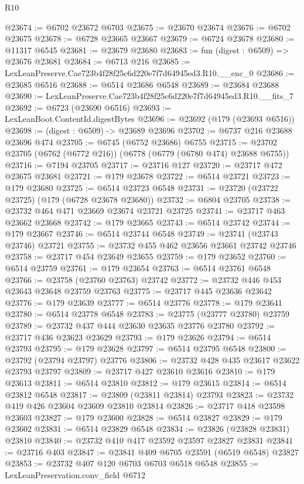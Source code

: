 \begin{lexlean}{R10}
\begin{coremodule}
@23674 := @6702 @23672 @6703
@23675 := @23670 @23674
@23676 := @6702 @23675
@23678 := @6728 @23665 @23667
@23679 := @6724 @23678
@23680 := @11317 @6545
@23681 := @23679 @23680
@23683 := fun (digest : @6509) => @23676 @23681
@23684 := @6713 @216
@23685 := LexLeanPreserve.Cae723b4f28f25c6d220e7f7d64945ed3.R10.__enc_0
@23686 := @23685 @6516
@23688 := @6514 @23686 @6548
@23689 := @23684 @23688
@23690 := LexLeanPreserve.Cae723b4f28f25c6d220e7f7d64945ed3.R10.__fits_7
@23692 := @6723 (@23690 @6516)
@23693 := LexLeanBoot.ContentId.digestBytes
@23696 := @23692 (@179 (@23693 @6516))
@23698 := (digest : @6509) -> @23689 @23696
@23702 := @6737 @216 @23688 @23696 @474
@23705 := @6745 (@6752 @23686) @6755
@23715 := @23702 @23705 (@6762 (@6772 @216)) (@6778 (@6779 (@6780 @474) @23688 @6755))
@23716 := @7194 @23705
@23717 := @23716 @127
@23720 := @23717 @472 @23675 @23681
@23721 := @179 @23678
@23722 := @6514 @23721
@23723 := @179 @23680
@23725 := @6514 @23723 @6548
@23731 := @23720 (@23722 @23725) (@179 (@6728 @23678 @23680))
@23732 := @6804 @23705
@23738 := @23732 @464 @471 @23669 @23674 @23721 @23725
@23741 := @23717 @463 @23662 @23668
@23742 := @179 @23665
@23743 := @6514 @23742
@23744 := @179 @23667
@23746 := @6514 @23744 @6548
@23749 := @23741 (@23743 @23746) @23721
@23755 := @23732 @455 @462 @23656 @23661 @23742 @23746
@23758 := @23717 @454 @23649 @23655
@23759 := @179 @23652
@23760 := @6514 @23759
@23761 := @179 @23654
@23763 := @6514 @23761 @6548
@23766 := @23758 (@23760 @23763) @23742
@23772 := @23732 @446 @453 @23643 @23648 @23759 @23763
@23775 := @23717 @445 @23636 @23642
@23776 := @179 @23639
@23777 := @6514 @23776
@23778 := @179 @23641
@23780 := @6514 @23778 @6548
@23783 := @23775 (@23777 @23780) @23759
@23789 := @23732 @437 @444 @23630 @23635 @23776 @23780
@23792 := @23717 @436 @23623 @23629
@23793 := @179 @23626
@23794 := @6514 @23793
@23795 := @179 @23628
@23797 := @6514 @23795 @6548
@23800 := @23792 (@23794 @23797) @23776
@23806 := @23732 @428 @435 @23617 @23622 @23793 @23797
@23809 := @23717 @427 @23610 @23616
@23810 := @179 @23613
@23811 := @6514 @23810
@23812 := @179 @23615
@23814 := @6514 @23812 @6548
@23817 := @23809 (@23811 @23814) @23793
@23823 := @23732 @419 @426 @23604 @23609 @23810 @23814
@23826 := @23717 @418 @23598 @23603
@23827 := @179 @23600
@23828 := @6514 @23827
@23829 := @179 @23602
@23831 := @6514 @23829 @6548
@23834 := @23826 (@23828 @23831) @23810
@23840 := @23732 @410 @417 @23592 @23597 @23827 @23831
@23841 := @23716 @403
@23847 := @23841 @409 @6705 @23591 (@6519 @6548) @23827
@23853 := @23732 @407 @120 @6703 @6703 @6518 @6548
@23855 := LexLeanPreservation.conv_field @6712

\end{coremodule}
\end{lexlean}

